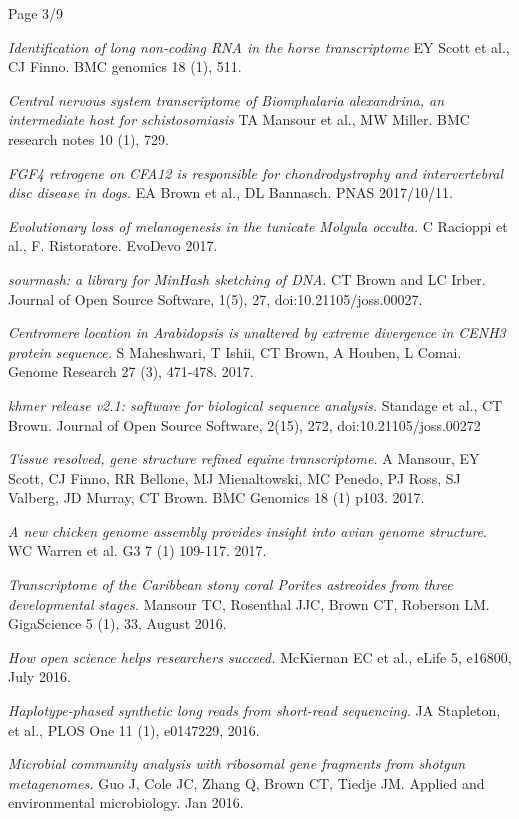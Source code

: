 \documentclass[margin,line]{resume}
\begin{document}
\begin{resume}
\vspace{2cm}
{\centerline {Page 3/9}}

\newpage

{\em Identification of long non-coding RNA in the horse transcriptome} EY Scott et al., CJ Finno. BMC genomics 18 (1), 511.

{\em Central nervous system transcriptome of Biomphalaria alexandrina, an intermediate host for schistosomiasis} TA Mansour et al., MW Miller. BMC research notes 10 (1), 729.

{\em FGF4 retrogene on CFA12 is responsible for chondrodystrophy and intervertebral disc disease in dogs.} EA Brown et al., DL Bannasch. PNAS 2017/10/11.

{\em Evolutionary loss of melanogenesis in the tunicate Molgula occulta.} C Racioppi et al., F. Ristoratore. EvoDevo 2017.

{\em sourmash: a library for MinHash sketching of DNA}. CT Brown and LC Irber. Journal of Open Source Software, 1(5), 27, doi:10.21105/joss.00027.

{\em Centromere location in Arabidopsis is unaltered by extreme divergence in CENH3 protein sequence.} S Maheshwari, T Ishii, CT Brown, A Houben, L Comai. Genome Research 27 (3), 471-478. 2017.

{\em khmer release v2.1: software for biological sequence analysis.} Standage et al., CT Brown. Journal of Open Source Software, 2(15), 272, doi:10.21105/joss.00272

{\em Tissue resolved, gene structure refined equine transcriptome.} A Mansour, EY Scott, CJ Finno, RR Bellone, MJ Mienaltowski, MC Penedo, PJ Ross, SJ Valberg, JD Murray, CT Brown. BMC Genomics 18 (1) p103. 2017.

{\em A new chicken genome assembly provides insight into avian genome structure}. WC Warren et al. G3 7 (1) 109-117. 2017.

{\em Transcriptome of the Caribbean stony coral Porites astreoides from three developmental stages.} Mansour TC, Rosenthal JJC, Brown CT, Roberson LM.
GigaScience 5 (1), 33, August 2016.

{\em How open science helps researchers succeed.}
McKiernan EC et al., eLife 5, e16800, July 2016.

{\em Haplotype-phased synthetic long reads from short-read sequencing.}
JA Stapleton, et al.,
PLOS One 11 (1), e0147229, 2016.

{\em Microbial community analysis with ribosomal gene fragments from shotgun metagenomes.} Guo J, Cole JC, Zhang Q, Brown CT, Tiedje JM. Applied and environmental microbiology. Jan 2016.


\end{resume}
\end{document}
